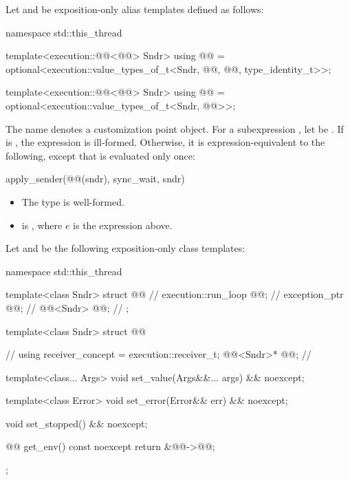 \pnum
Let  and
be exposition-only alias templates defined as follows:
\begin{codeblock}
namespace std::this_thread {
  template<execution::@@<@@> Sndr>
    using @@ =
      optional<execution::value_types_of_t<Sndr, @@, @@,
               type_identity_t>>;

  template<execution::@@<@@> Sndr>
    using @@ =
      optional<execution::value_types_of_t<Sndr, @@>>;
}
\end{codeblock}

\pnum
The name  denotes a customization point object.
For a subexpression , let  be .
If 
is ,
the expression  is ill-formed.
Otherwise, it is expression-equivalent to the following,
except that  is evaluated only once:
\begin{codeblock}
apply_sender(@@(sndr), sync_wait, sndr)
\end{codeblock}
\mandates
\begin{itemize}
\item
The type  is well-formed.
\item
{}
is , where $e$ is the  expression above.
\end{itemize}

\pnum
Let  and 
be the following exposition-only class templates:
\begin{codeblock}
namespace std::this_thread {
  template<class Sndr>
  struct @@ {                                      // \expos
    execution::run_loop @@;                                   // \expos
    exception_ptr @@;                                        // \expos
    @@<Sndr> @@;                         // \expos
  };

  template<class Sndr>
  struct @@ {                                   // \expos
    using receiver_concept = execution::receiver_t;
    @@<Sndr>* @@;                               // \expos

    template<class... Args>
    void set_value(Args&&... args) && noexcept;

    template<class Error>
    void set_error(Error&& err) && noexcept;

    void set_stopped() && noexcept;

    @@ get_env() const noexcept { return {&@@->@@}; }
  };
}
\end{codeblock}

